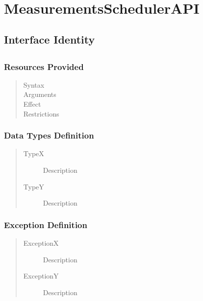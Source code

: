 \section{MeasurementsSchedulerAPI}

\subsection{Interface Identity}

\subsection{}

\subsubsection{Resources Provided}

\begin{quote}
	\begin{description}
		\item[Syntax]
		\item[Arguments]
		\item[Effect]
		\item[Restrictions]
	\end{description} 
\end{quote}

\subsubsection{Data Types Definition}

\begin{quote}
	\begin{description}
		\item[TypeX] Description
		\item[TypeY] Description
	\end{description} 
\end{quote}

\subsubsection{Exception Definition} 

\begin{quote}
	\begin{description}
		\item[ExceptionX] Description
		\item[ExceptionY] Description
	\end{description} 
\end{quote}